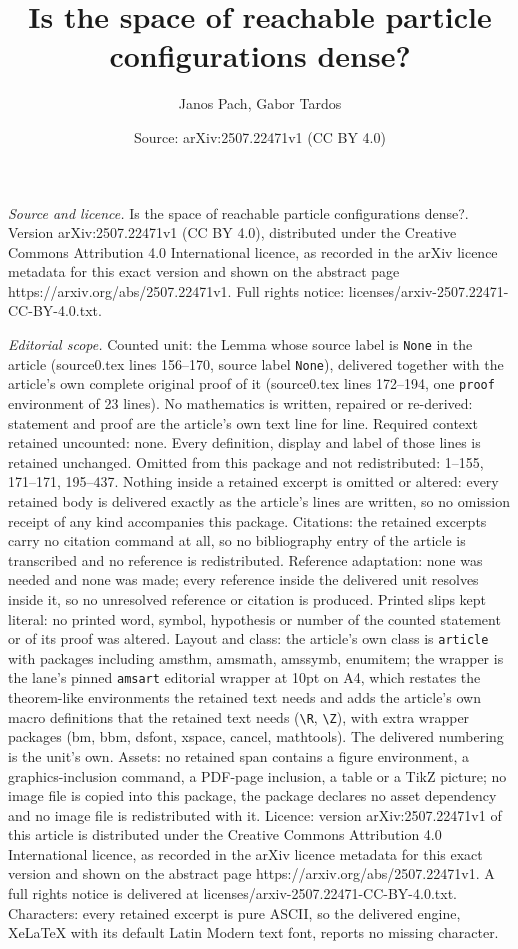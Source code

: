 \documentclass[10pt,a4paper]{amsart}
\title[Is the space of reachable particle configurations dense?]{Is the space of reachable particle configurations dense?}
\author{Janos Pach, Gabor Tardos}
\date{Source: arXiv:2507.22471v1 (CC BY 4.0)}
\begin{document}
\maketitle

\noindent\emph{Source and licence.} Is the space of reachable particle configurations dense?. Version arXiv:2507.22471v1 (CC BY 4.0), distributed under the Creative Commons Attribution 4.0 International licence, as recorded in the arXiv licence metadata for this exact version and shown on the abstract page https://arxiv.org/abs/2507.22471v1. Full rights notice: licenses/arxiv-2507.22471-CC-BY-4.0.txt.\par\smallskip

\noindent\textit{Editorial scope.} Counted unit: the Lemma whose source label is \texttt{None} in the article (source0.tex lines 156--170, source label \texttt{None}), delivered together with the article's own complete original proof of it (source0.tex lines 172--194, one \texttt{proof} environment of 23 lines). No mathematics is written, repaired or re-derived: statement and proof are the article's own text line for line. Required context retained uncounted: none. Every definition, display and label of those lines is retained unchanged. Omitted from this package and not redistributed: 1--155, 171--171, 195--437. Nothing inside a retained excerpt is omitted or altered: every retained body is delivered exactly as the article's lines are written, so no omission receipt of any kind accompanies this package. Citations: the retained excerpts carry no citation command at all, so no bibliography entry of the article is transcribed and no reference is redistributed. Reference adaptation: none was needed and none was made; every reference inside the delivered unit resolves inside it, so no unresolved reference or citation is produced. Printed slips kept literal: no printed word, symbol, hypothesis or number of the counted statement or of its proof was altered. Layout and class: the article's own class is \texttt{article} with packages including amsthm, amsmath, amssymb, enumitem; the wrapper is the lane's pinned \texttt{amsart} editorial wrapper at 10pt on A4, which restates the theorem-like environments the retained text needs and adds the article's own macro definitions that the retained text needs (\texttt{\textbackslash R}, \texttt{\textbackslash Z}), with extra wrapper packages (bm, bbm, dsfont, xspace, cancel, mathtools). The delivered numbering is the unit's own. Assets: no retained span contains a figure environment, a graphics-inclusion command, a PDF-page inclusion, a table or a TikZ picture; no image file is copied into this package, the package declares no asset dependency and no image file is redistributed with it. Licence: version arXiv:2507.22471v1 of this article is distributed under the Creative Commons Attribution 4.0 International licence, as recorded in the arXiv licence metadata for this exact version and shown on the abstract page https://arxiv.org/abs/2507.22471v1. A full rights notice is delivered at licenses/arxiv-2507.22471-CC-BY-4.0.txt. Characters: every retained excerpt is pure ASCII, so the delivered engine, XeLaTeX with its default Latin Modern text font, reports no missing character.
\end{document}
